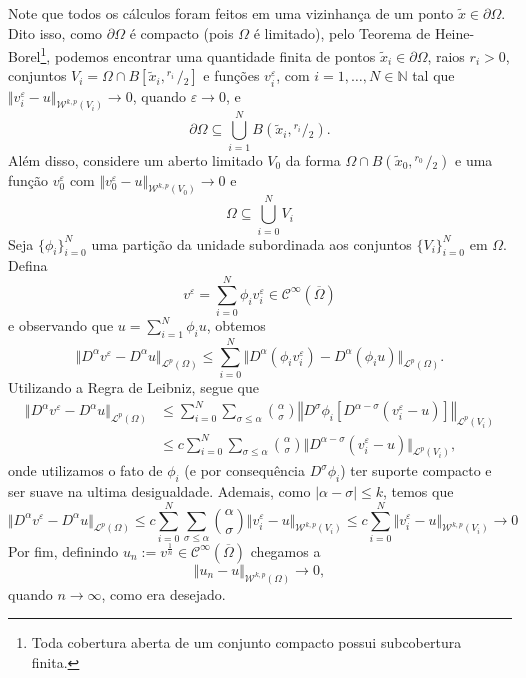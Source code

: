 \documentclass[a4paper, 11pt]{book}
\theoremstyle{definition}
\newcommand{\bN}{\mathbb{N}}
\newcommand{\cC}{\mathcal{C}}
\newcommand{\cL}{\mathcal{L}}
\newcommand{\cW}{\mathcal{W}}
\newcommand{\sfrac}[2]{{}^{#1}\!\!/\!_{#2}}
\begin{document}
\begin{prf}
    Note que todos os cálculos foram feitos em uma vizinhança de um ponto $\tilde x \in \partial\Omega$. Dito isso, como $\partial \Omega$ é compacto (pois $\Omega$ é limitado), pelo Teorema de Heine-Borel\footnote{Toda cobertura aberta de um conjunto compacto possui subcobertura finita.}, podemos encontrar uma quantidade finita de pontos $\tilde x_i \in \partial \Omega$, raios $r_i > 0$, conjuntos $V_i = \Omega \cap B[\tilde x_i,\sfrac{r_i\,}{2}]$ e funções $v_i^\varepsilon$, com $i = 1,\dots,N \in \bN$ tal que $\Vert v_i^\varepsilon - u \Vert_{\cW^{k,p}(V_i)} \to 0$, quando $\varepsilon \to 0$, e 
    \[
        \partial\Omega \subseteq \bigcup_{i=1}^N B(\tilde x_i, \sfrac{r_i}{2}).
    \]
    Além disso, considere um aberto limitado $V_0$ da forma $\Omega \cap B(\tilde x_0, \sfrac{r_0\,}{2})$ e uma função $v^\varepsilon_0$ com $\Vert v^\varepsilon_0 - u \Vert_{\cW^{k,p}(V_0)} \to 0$ e
    \[
        \Omega \subseteq \bigcup_{i=0}^N V_i
    \]
    Seja $\{\phi_i\}_{i=0}^N$ uma partição da unidade subordinada aos conjuntos $\{V_i\}_{i=0}^N$ em $\Omega$.
    Defina
    \[
        v^\varepsilon = \sum_{i=0}^N \phi_i v_i^\varepsilon \in \cC^{\infty}(\overline\Omega)
    \]
    e observando que $u = \sum_{i=1}^N \phi_i u$, obtemos
    \[
        \Vert D^\alpha v^\varepsilon - D^\alpha u \Vert_{\cL^p(\Omega)} \leqslant \sum_{i=0}^N \Vert D^\alpha (\phi_i v_i^\varepsilon) - D^\alpha(\phi_i u) \Vert_{\cL^p(\Omega)}.
    \]
    Utilizando a Regra de Leibniz, segue que
    \[
        \begin{aligned}
            \Vert D^\alpha v^\varepsilon - D^\alpha u \Vert_{\cL^p(\Omega)} &\leqslant \sum_{i=0}^N\sum_{\sigma \leqslant \alpha} \binom{\alpha}{\sigma} \left\Vert  D^{\sigma} \phi_i \left[ D^{\alpha - \sigma} \left( v_i^\varepsilon - u \right) \right] \right\Vert _{\cL^p(V_i)}\\ 
            &\leqslant c\sum_{i=0}^N\sum_{\sigma \leqslant \alpha} \binom{\alpha}{\sigma} \Vert D^{\alpha-\sigma}(v^\varepsilon_i - u) \Vert_{\cL^p(V_i)},
        \end{aligned}
    \]
    onde utilizamos o fato de $\phi_i$ (e por consequência $D^\sigma \phi_i$) ter suporte compacto e ser suave na ultima desigualdade. 
    Ademais, como $|\alpha - \sigma| \leqslant k$, temos que
    \[
        \Vert D^\alpha v^\varepsilon - D^\alpha u \Vert_{\cL^p(\Omega)} \leqslant c \sum_{i=0}^N\sum_{\sigma \leqslant \alpha} \binom{\alpha}{\sigma} \Vert v_i^\varepsilon - u \Vert_{\cW^{k,p}(V_i)} \leqslant c\sum_{i=0}^N \Vert v_i^\varepsilon - u \Vert_{\cW^{k,p}(V_i)} \to 0 
    \]
    Por fim, definindo $u_n := v^{\frac{1}{n}} \in \cC^{\infty}(\overline\Omega)$ chegamos a 
    \[
        \Vert u_n - u \Vert_{\cW^{k,p}(\Omega)} \to 0,
    \]
    quando $n \to \infty$, como era desejado.
\end{prf}
\end{document}
